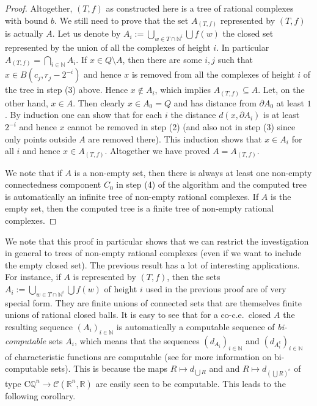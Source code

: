 \documentclass[a4paper]{amsart}
\def\CC{{\mathcal C}}
\def\IN{{\mathbb{N}}}
\def\IQ{{\mathbb{Q}}}
\def\IR{{\mathbb{R}}}
\def\In{\subseteq}
\def\cc{\mathrm c}
\def\CQ{\mathrm C\IQ}
\theoremstyle{definition}
\begin{document}
\begin{proof}
Altogether, $(T,f)$ as constructed here is a tree of rational complexes with bound $b$.
We still need to prove that the set $A_{(T,f)}$ represented by $(T,f)$ is actually $A$.
Let us denote by $A_i:=\bigcup_{w\in T\cap\IN^i}\bigcup f(w)$ the closed set represented by the union of all the complexes
of height $i$. In particular $A_{(T,f)}=\bigcap_{i\in\IN}A_i$. 
If $x\in Q\setminus A$, then there are some $i,j$ such that $x\in B(c_j,r_j-2^{-i})$ and hence $x$ is removed from all the complexes
of height $i$ of the tree in step (3) above. Hence $x\not\in A_i$, which implies $A_{(T,f)}\In A$.
Let, on the other hand, $x\in A$. Then clearly $x\in A_0=Q$ and has distance from $\partial A_0$ at least $1$.
By induction one can show that for each $i$ the distance $d(x,\partial A_i)$ is at least $2^{-i}$ and hence $x$ cannot 
be removed in step (2) (and also not in step (3) since only points outside $A$ are removed there).  
This induction shows that $x\in A_i$ for all $i$ and hence $x\in A_{(T,f)}$.
Altogether we have proved $A=A_{(T,f)}$.

We note that if $A$ is a non-empty set, then there is always at least one non-empty connectedness component $C_0$ in step (4) of the 
algorithm and the computed tree is automatically an infinite tree of non-empty rational complexes. If $A$ is the empty set,
then the computed tree is a finite tree of non-empty rational complexes.
\end{proof}

We note that this proof in particular shows that we can restrict the investigation in general to trees of non-empty rational complexes
(even if we want to include the empty closed set).
The previous result has a lot of interesting applications. For instance, if $A$ is represented by $(T,f)$, then the sets 
$A_i:=\bigcup_{w\in T\cap\IN^i}\bigcup f(w)$ of height $i$ used in the previous proof are of very special form.
They are finite unions of connected sets that are themselves finite unions of rational closed balls.
It is easy to see that for a co-c.e.\ closed $A$ the resulting sequence $(A_i)_{i\in\IN}$ is automatically
a computable sequence of {\em bi-computable} sets $A_i$, which means that the sequences $(d_{A_i})_{i\in\IN}$
and $(d_{A_i^\cc})_{i\in\IN}$ of characteristic functions are computable (see \cite{Her99b} for more information on bi-computable sets).
This is because the maps $R\mapsto d_{\bigcup R}$ and and $R\mapsto d_{(\bigcup R)^\cc}$ of type $\CQ^n\to\CC(\IR^n,\IR)$
are easily seen to be computable. 
This leads to the following corollary.
\end{document}
